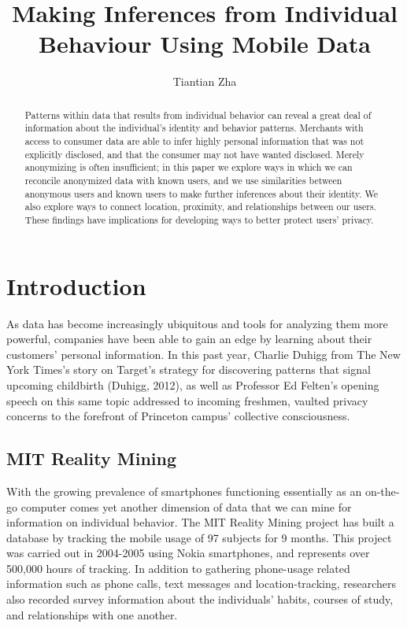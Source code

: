 \documentclass[pageno]{jpaper}
\begin{document}
\title{
Making Inferences from Individual Behaviour Using Mobile Data}

\author{Tiantian Zha}

\date{}
\maketitle

\thispagestyle{empty}

\begin{abstract}
Patterns within data that results from individual behavior can reveal a great deal of information about the individual's identity and behavior patterns. Merchants with access to consumer data are able to infer highly personal information that was not explicitly disclosed, and that the consumer may not have wanted disclosed. Merely anonymizing is often insufficient; in this paper we explore ways in which we can reconcile anonymized data with known users, and we use similarities between anonymous users and known users to make further inferences about their identity. We also explore ways to connect location, proximity, and relationships between our users. These findings have implications for developing ways to better protect users' privacy. 

\end{abstract}

\section{Introduction}

As data has become increasingly ubiquitous and tools for analyzing them more powerful, companies have been able to gain an edge by learning about their customers' personal information. In this past year, Charlie Duhigg from The New York Times's story on Target's strategy for discovering patterns that signal upcoming childbirth (Duhigg, 2012), as well as Professor Ed Felten's opening speech on this same topic addressed to incoming freshmen, vaulted privacy concerns to the forefront of Princeton campus' collective consciousness. 

\subsection{MIT Reality Mining}
With the growing prevalence of smartphones functioning essentially as an on-the-go computer comes yet another dimension of data that we can mine for information on individual behavior. The MIT Reality Mining project has built a database by tracking the mobile usage of 97 subjects for 9 months. This project was carried out in 2004-2005 using Nokia smartphones, and represents over 500,000 hours of tracking. In addition to gathering phone-usage related information such as phone calls, text messages and location-tracking, researchers also recorded survey information about the individuals' habits, courses of study, and relationships with one another.
\end{document}
